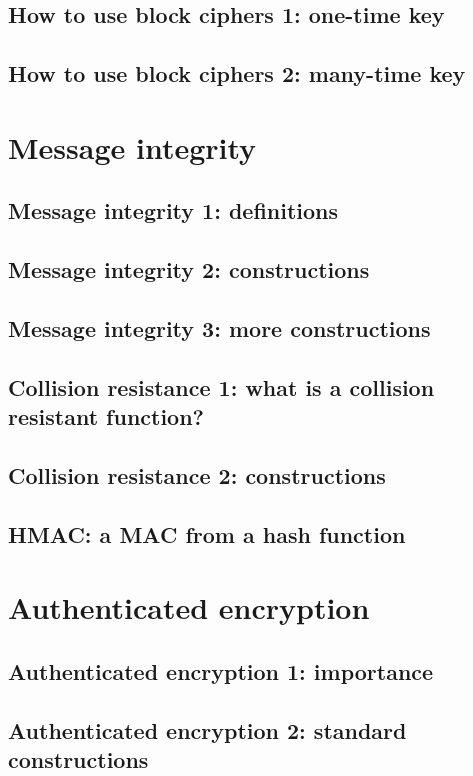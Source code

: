 \documentclass[10pt,a4paper]{report}
\begin{document}
\section{How to use block ciphers 1: one-time key}
\section{How to use block ciphers 2: many-time key}

\chapter{Message integrity}

\section{Message integrity 1: definitions}
\section{Message integrity 2: constructions}
\section{Message integrity 3: more constructions}
\section{Collision resistance 1: what is a collision resistant function?}
\section{Collision resistance 2: constructions}
\section{HMAC: a MAC from a hash function}

\chapter{Authenticated encryption}

\section{Authenticated encryption 1: importance}
\section{Authenticated encryption 2: standard constructions}
\end{document}
